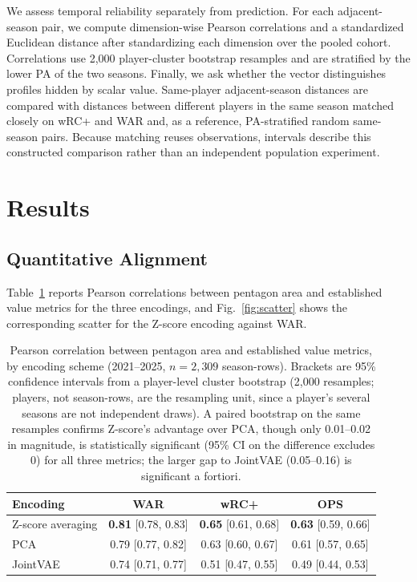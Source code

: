 \documentclass[10pt,twocolumn,letterpaper]{article}
\begin{document}
We assess temporal reliability separately from prediction. For each adjacent-season pair, we compute dimension-wise Pearson correlations and a standardized Euclidean distance after standardizing each dimension over the pooled cohort. Correlations use 2{,}000 player-cluster bootstrap resamples and are stratified by the lower PA of the two seasons. Finally, we ask whether the vector distinguishes profiles hidden by scalar value. Same-player adjacent-season distances are compared with distances between different players in the same season matched closely on wRC+ and WAR and, as a reference, PA-stratified random same-season pairs. Because matching reuses observations, intervals describe this constructed comparison rather than an independent population experiment.

\section{Results}
\label{sec:results}

\subsection{Quantitative Alignment}
Table~\ref{tab:corr} reports Pearson correlations between pentagon area and established value metrics for the three encodings, and Fig.~\ref{fig:scatter} shows the corresponding scatter for the Z-score encoding against WAR.

\begin{table}[t]
\centering
\caption{Pearson correlation between pentagon area and established value metrics, by encoding scheme (2021--2025, $n=2{,}309$ season-rows). Brackets are 95\% confidence intervals from a player-level cluster bootstrap (2{,}000 resamples; players, not season-rows, are the resampling unit, since a player's several seasons are not independent draws). A paired bootstrap on the same resamples confirms Z-score's advantage over PCA, though only 0.01--0.02 in magnitude, is statistically significant (95\% CI on the difference excludes 0) for all three metrics; the larger gap to JointVAE (0.05--0.16) is significant a fortiori.}
\label{tab:corr}
\small
\begin{tabular}{lccc}
\toprule
Encoding & WAR & wRC+ & OPS \\
\midrule
Z-score averaging & \textbf{0.81} {\scriptsize[0.78, 0.83]} & \textbf{0.65} {\scriptsize[0.61, 0.68]} & \textbf{0.63} {\scriptsize[0.59, 0.66]} \\
PCA               & 0.79 {\scriptsize[0.77, 0.82]} & 0.63 {\scriptsize[0.60, 0.67]} & 0.61 {\scriptsize[0.57, 0.65]} \\
JointVAE          & 0.74 {\scriptsize[0.71, 0.77]} & 0.51 {\scriptsize[0.47, 0.55]} & 0.49 {\scriptsize[0.44, 0.53]} \\
\bottomrule
\end{tabular}
\end{table}
\end{document}
